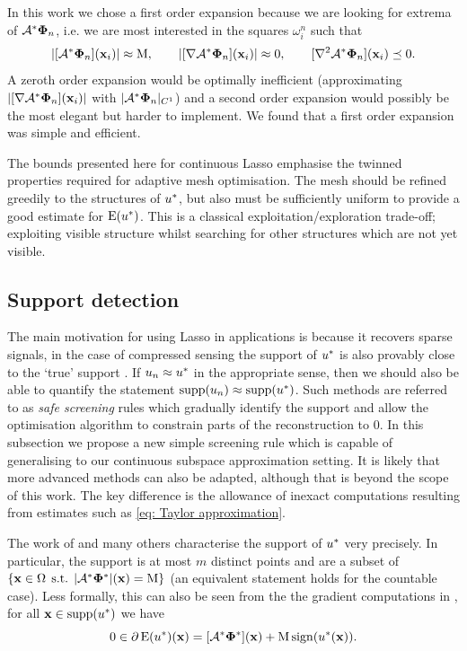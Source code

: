 \documentclass[10pt,a4paper,onecolumn]{article}
\numberwithin{equation}{section}
\newcommand{\op}[1]{\operatorname{#1}}\newcommand{\overtext}[2]{\stackrel{\text{#1}}{#2}}
\DeclareMathOperator{\st}{\;s.t.\;}\DeclareMathOperator{\as}{\;a.s.\;}\renewcommand{\epsilon}{\varepsilon}
\renewcommand{\vec}{\mathbf}
\newcommand{\UCmath}[1]{%
	\begingroup
	\ucmathlist\uppercase\expandafter{#1}%
	\endgroup
}
\newcommand{\ucmathlist}{%
	\def\alpha{\mathrm{A}}%
	\def\beta{\mathrm{B}}%
	\let\gamma=\Gamma
	\let\delta=\Delta
	\def\epsilon{\mathrm{E}}%
	\def\varepsilon{\mathrm{E}}%
	\def\zeta{\mathrm{Z}}%
	\def\eta{\mathrm{H}}%
	\let\theta=\Theta
	\let\vartheta=\Theta
	\def\iota{\mathrm{I}}%
	\def\kappa{\mathrm{K}}%
	\let\lambda=\Lambda
	\def\mu{\mathrm{M}}%
	\def\nu{\mathrm{N}}%
	\let\xi=\Xi
	\let\pi=\Pi
	\let\varpi=\Pi
	\def\rho{\mathrm{P}}%
	\def\varrho{\mathrm{P}}%
	\let\sigma=\Sigma
	\def\tau{\mathrm{T}}%
	\let\upsilon=\Upsilon
	\let\phi=\Phi
	\let\varphi=\Phi
	\def\chi{\mathrm{X}}%
	\let\psi=\Psi
	\let\omega=\Omega
}
\newcommand{\caps}[1]{\UCmath{#1}}
\newcommand*{\Func}[1]{%
	\IfEqCase{#1}{%
		{0}{\op{E}}%
		{1}{\op{F}}%
		{2}{\op{G}}%
		{3}{\op{H}}%
	}[\op{F}#1]%
}
\newcommand*{\varf}[1]{%
	\IfEqCase{#1}{%
		{0}{u}%
		{1}{v}%
		{2}{w}%
	}[u#1]%
}
\newcommand*{\vard}[1]{%
	\IfEqCase{#1}{%
		{0}{\varphi}%
		{1}{\psi}%
	}[\varphi #1]%
}
\newcommand*{\varx}[1]{%
	\IfEqCase{#1}{%
		{0}{x}%
		{1}{y}%
		{2}{z}%
		{3}{r}%
	}[x#1]%
}
\newcommand*{\data}[1]{%
	\IfEqCase{#1}{%
		{0}{\eta}%
		{1}{\nu}%
	}[g]%
}
\newcommand{\Domain}{\Omega}
\newcommand{\domain}{\omega}
\newcommand*{\Varx}[1]{\caps{\varx{#1}}}
\newcommand*{\vvarx}[1]{\vec{\varx{#1}}}\newcommand*{\vVarx}[1]{\vec{\Varx{#1}}}
\newcommand*{\vvard}[1]{\vec{\vard{#1}}}\newcommand*{\vdata}[1]{\vec{\data{#1}}}
\begin{document}
In this work we chose a first order expansion because we are looking for extrema of $\A^*\vvard0_n$, i.e. we are most interested in the squares $\domain_i^n$ such that 
\begin{equation}
	|[\A^*\vvard0_n](\vvarx0_i)| \approx \mu, \qquad |[\nabla\A^*\vvard0_n](\vvarx0_i)| \approx 0, \qquad [\nabla^2\A^*\vvard0_n](\vvarx0_i) \preceq 0. 
\end{equation}
A zeroth order expansion would be optimally inefficient (approximating $|[\nabla\A^*\vvard0_n](\vvarx0_i)|$ with $|\A^*\vvard0_n|_{C^1}$) and a second order expansion would possibly be the most elegant but harder to implement. We found that a first order expansion was simple and efficient.

The bounds presented here for continuous Lasso emphasise the twinned properties required for adaptive mesh optimisation. The mesh should be refined greedily to the structures of $\varf0^*$, but also must be sufficiently uniform to provide a good estimate for $\Func0(\varf0^*)$. This is a classical exploitation/exploration trade-off; exploiting visible structure whilst searching for other structures which are not yet visible.



\subsection{Support detection}\label{sec: support detection}
The main motivation for using Lasso in applications is because it recovers sparse signals, in the case of compressed sensing the support of $\varf0^*$ is also provably close to the `true' support \citep{Duval2017a,Poon2018}. If $\varf0_n\approx \varf0^*$ in the appropriate sense, then we should also be able to quantify the statement $\op{supp}(\varf0_n)\approx\op{supp}(\varf0^*)$. Such methods are referred to as \emph{safe screening} rules \citep{ElGhaoui2010} which gradually identify the support and allow the optimisation algorithm to constrain parts of the reconstruction to 0. In this subsection we propose a new simple screening rule which is capable of generalising to our continuous subspace approximation setting. It is likely that more advanced methods \citep{Bonnefoy2015,Ndiaye2017} can also be adapted, although that is beyond the scope of this work. The key difference is the allowance of inexact computations resulting from estimates such as \eqref{eq: Taylor approximation}.

The work of \citet{Duval2017a,Poon2018} and many others characterise the support of $\varf0^*$ very precisely. In particular, the support is at most $m$ distinct points and are a subset of $\{ \vvarx0\in\Domain \st |\A^*\vvard0^*|(\vvarx0) = \mu\} $ (an equivalent statement holds for the countable case). Less formally, this can also be seen from the the gradient computations in , for all $\vvarx0\in\supp(\varf0^*)$ we have
\begin{equation}
	0\in \partial \Func0(\varf0^*)(\vvarx0) = [\A^*\vvard0^*](\vvarx0) + \mu\sign(\varf0^*(\vvarx0)).
\end{equation}
\end{document}
